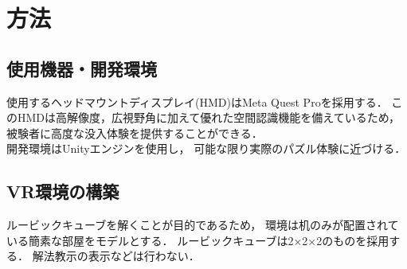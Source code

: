 \section{方法}
  \subsection{使用機器・開発環境}
    使用するヘッドマウントディスプレイ(HMD)はMeta Quest Proを採用する．
    このHMDは高解像度，広視野角に加えて優れた空間認識機能を備えているため，
    被験者に高度な没入体験を提供することができる．
    \\\indent
    開発環境はUnityエンジンを使用し，
    可能な限り実際のパズル体験に近づける．
    \\\indent

  \subsection{VR環境の構築}
    ルービックキューブを解くことが目的であるため，
    環境は机のみが配置されている簡素な部屋をモデルとする．
    ルービックキューブは2×2×2のものを採用する．
    解法教示の表示などは行わない．
    
